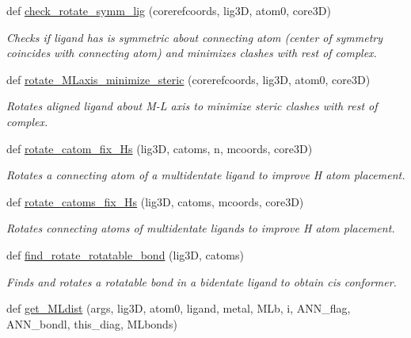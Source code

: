 \begin{DoxyCompactItemize}
def \hyperlink{namespacemolSimplify_1_1Scripts_1_1structgen_a7a42738de45a860a1c6d28922d008136}{check\+\_\+rotate\+\_\+symm\+\_\+lig} (corerefcoords, lig3D, atom0, core3D)
\begin{DoxyCompactList}\small\item\em Checks if ligand has is symmetric about connecting atom (center of symmetry coincides with connecting atom) and minimizes clashes with rest of complex. \end{DoxyCompactList}\item 
def \hyperlink{namespacemolSimplify_1_1Scripts_1_1structgen_aed8e7b09083ade40bbfd8001f18bd0a2}{rotate\+\_\+\+M\+Laxis\+\_\+minimize\+\_\+steric} (corerefcoords, lig3D, atom0, core3D)
\begin{DoxyCompactList}\small\item\em Rotates aligned ligand about M-\/L axis to minimize steric clashes with rest of complex. \end{DoxyCompactList}\item 
def \hyperlink{namespacemolSimplify_1_1Scripts_1_1structgen_a9c4c45a6c8757db294e57137c875b848}{rotate\+\_\+catom\+\_\+fix\+\_\+\+Hs} (lig3D, catoms, n, mcoords, core3D)
\begin{DoxyCompactList}\small\item\em Rotates a connecting atom of a multidentate ligand to improve H atom placement. \end{DoxyCompactList}\item 
def \hyperlink{namespacemolSimplify_1_1Scripts_1_1structgen_acef75ef9f8bfc225c6b2bd327c3a2bed}{rotate\+\_\+catoms\+\_\+fix\+\_\+\+Hs} (lig3D, catoms, mcoords, core3D)
\begin{DoxyCompactList}\small\item\em Rotates connecting atoms of multidentate ligands to improve H atom placement. \end{DoxyCompactList}\item 
def \hyperlink{namespacemolSimplify_1_1Scripts_1_1structgen_ae544f12f83f1b924270e798011a4dfc3}{find\+\_\+rotate\+\_\+rotatable\+\_\+bond} (lig3D, catoms)
\begin{DoxyCompactList}\small\item\em Finds and rotates a rotatable bond in a bidentate ligand to obtain cis conformer. \end{DoxyCompactList}\item 
def \hyperlink{namespacemolSimplify_1_1Scripts_1_1structgen_aa5c9d690144b1d971dbca6f8ec29ef6f}{get\+\_\+\+M\+Ldist} (args, lig3D, atom0, ligand, metal, M\+Lb, i, A\+N\+N\+\_\+flag, A\+N\+N\+\_\+bondl, this\+\_\+diag, M\+Lbonds)

\end{DoxyCompactItemize}
